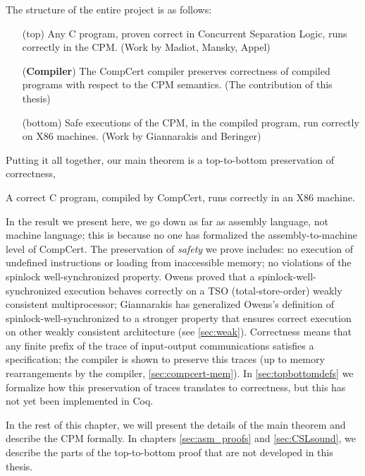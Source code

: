 The structure of the entire project is as follows:


\begin{enumerate}[leftmargin=\widthof{(Compiler)}+\labelsep, rightmargin=2cm] %
\item[(top)] Any C program, proven correct in Concurrent Separation Logic, runs correctly in the CPM. (Work by Madiot, Mansky, Appel)
\item[(\textbf{Compiler})] The CompCert compiler preserves correctness of compiled programs with respect to the CPM semantics. (The contribution of this thesis)
\item[(bottom)] Safe executions of the CPM, in the compiled program, run correctly on X86 machines. (Work by Giannarakis and Beringer)
\end{enumerate}

Putting it all together, our main theorem is a top-to-bottom preservation of correctness,
\begin{theorem}\label{mainthm}
A correct C program, compiled by CompCert, runs correctly in an X86 machine.
\end{theorem}

In the result we present here, we go down as far as assembly language, not machine language; this is because no one has formalized the assembly-to-machine level of CompCert. The preservation of \emph{safety} we prove includes: no execution of undefined instructions or loading from inaccessible memory; no violations of the spinlock well-synchronized property. Owens \cite{owens10:ecoop} proved that a spinlock-well-synchronized execution behaves correctly on a TSO (total-store-order) weakly consistent multiprocessor; Giannarakis has generalized Owens's definition of spinlock-well-synchronized to a stronger property that ensures correct execution on other weakly consistent architecture (see \autoref{sec:weak}). Correctness means that any finite prefix of the trace of input-output communications satisfies a specification; the compiler is shown to preserve this traces (up to memory rearrangements by the compiler, \autoref{sec:compcert-mem}). In \autoref{sec:topbottomdefs} we formalize how this preservation of traces translates to correctness, but this has not yet been implemented in Coq.

In the rest of this chapter, we will present the details of the main theorem and describe the CPM formally. In chapters \ref{sec:asm_proofs} and \ref{sec:CSLsound}, we describe the parts of the top-to-bottom proof that are not developed in this thesis. 



%
